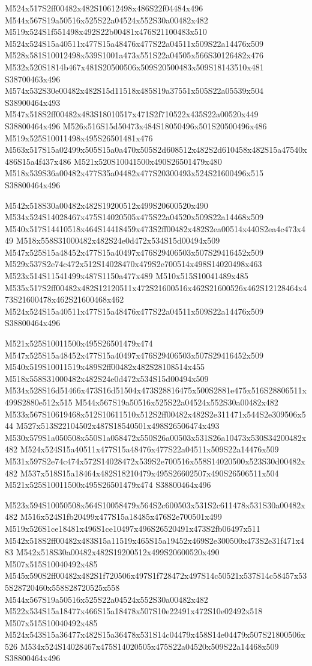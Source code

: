 \documentclass{article}
\begin{document}
\begin{multicols}{2}
M524x517S2ff00482x482S10612498x486S22f04484x496 M544x567S19a50516x525S22a04524x552S30a00482x482 M519x524S1f551498x492S22b00481x476S21100483x510 M524x524S15a40511x477S15a48476x477S22a04511x509S22a14476x509 M528x581S10012498x539S1001a473x551S22a04505x566S30126482x476 M532x520S1814b467x481S20500506x509S20500483x509S18143510x481 S38700463x496 M574x532S30e00482x482S15d11518x485S19a37551x505S22a05539x504 S38900464x493 M547x518S2ff00482x483S18010517x471S2f710522x435S22a00520x449 S38800464x496 M526x516S15d50473x484S18050496x501S20500496x486 M519x525S10011498x495S26501481x476 M563x517S15a02499x505S15a0a470x505S2d608512x482S2d610458x482S15a47540x486S15a4f437x486 M521x520S10041500x490S26501479x480 M518x539S36a00482x477S35a04482x477S20300493x524S21600496x515 S38800464x496

M542x518S30a00482x482S19200512x499S20600520x490 M534x524S14028467x475S14020505x475S22a04520x509S22a14468x509 M540x517S14410518x464S14418459x473S2ff00482x482S2ea00514x440S2ea4c473x449 M518x558S31000482x482S24e0d472x534S15d00494x509 M547x525S15a48452x477S15a40497x476S29406503x507S29416452x509 M529x537S2e74c472x512S14028470x479S2e700514x498S14020498x463 M523x514S11541499x487S1150a477x489 M510x515S10041489x485 M535x517S2ff00482x482S12120511x472S21600516x462S21600526x462S12128464x473S21600478x462S21600468x462 M524x524S15a40511x477S15a48476x477S22a04511x509S22a14476x509 S38800464x496

M521x525S10011500x495S26501479x474 M547x525S15a48452x477S15a40497x476S29406503x507S29416452x509 M540x519S10011519x489S2ff00482x482S28108514x455 M518x558S31000482x482S24e0d472x534S15d00494x509 M534x528S16d51466x473S16d51504x473S28816475x500S2881e475x516S28806511x499S2880e512x515 M544x567S19a50516x525S22a04524x552S30a00482x482 M533x567S10619468x512S10611510x512S2ff00482x482S2e311471x544S2e309506x544 M527x513S22104502x487S18540501x498S26506474x493 M530x579S1a050508x550S1a058472x550S26a00503x531S26a10473x530S34200482x482 M524x524S15a40511x477S15a48476x477S22a04511x509S22a14476x509 M531x597S2e74c474x572S14028472x539S2e700516x558S14020500x523S30d00482x482 M537x518S15a18464x482S18210479x495S26602507x490S26506511x504 M521x525S10011500x495S26501479x474 S38800464x496

M523x594S10050508x564S10058479x564S2c600503x531S2c611478x531S30a00482x482 M516x524S1fb20499x477S15a18485x476S2e700501x499 M519x526S1ce18481x496S1ce10497x496S26520491x473S2fb06497x511 M542x518S2ff00482x483S15a11519x465S15a19452x469S2e300500x473S2e31f471x483 M542x518S30a00482x482S19200512x499S20600520x490 M507x515S10040492x485 M545x590S2ff00482x482S1f720506x497S1f728472x497S14c50521x537S14c58457x535S28720460x558S28720525x558 M544x567S19a50516x525S22a04524x552S30a00482x482 M522x534S15a18477x466S15a18478x507S10e22491x472S10e02492x518 M507x515S10040492x485 M524x543S15a36477x482S15a36478x531S14c04479x458S14e04479x507S21800506x526 M534x524S14028467x475S14020505x475S22a04520x509S22a14468x509 S38800464x496


\end{multicols}
\end{document}
